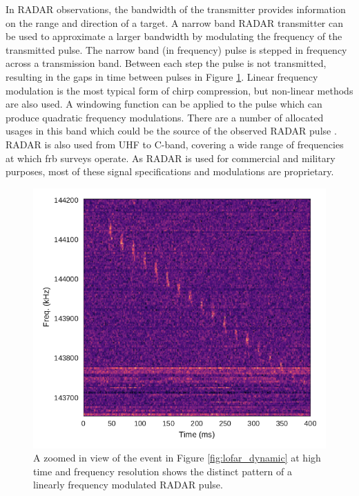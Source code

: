 \documentclass[a4paper,fleqn,usenatbib]{mnras}
\begin{document}
In RADAR observations, the bandwidth of the transmitter provides information on
the range and direction of a target. A narrow band RADAR transmitter can be used
to approximate a larger bandwidth by modulating the frequency of the transmitted
pulse. The narrow band (in frequency) pulse is stepped in frequency across a
transmission band. Between each step the pulse is not transmitted, resulting in
the gaps in time between pulses in Figure \ref{fig:lofar_dynamic_high}. Linear
frequency modulation is the most typical form of chirp compression, but
non-linear methods are also used. A windowing function can be applied to the
pulse which can produce quadratic frequency modulations.  There are a number of
allocated usages in this band which could be the source of the observed RADAR
pulse \citep{ofcom2017}. RADAR is also used from UHF to C-band, covering a wide
range of frequencies at which \gls{frb} surveys operate. As RADAR is used for
commercial and military purposes, most of these signal specifications and
modulations are proprietary.

\begin{figure}
    \includegraphics[width=1.0\linewidth]{figures/LOFAR_dynamic_high_res.pdf}
    \caption{A zoomed in view of the event in Figure \ref{fig:lofar_dynamic} at
    high time and frequency resolution shows the distinct pattern of a linearly
    frequency modulated RADAR pulse.
    }
    \label{fig:lofar_dynamic_high}
\end{figure}
\end{document}
